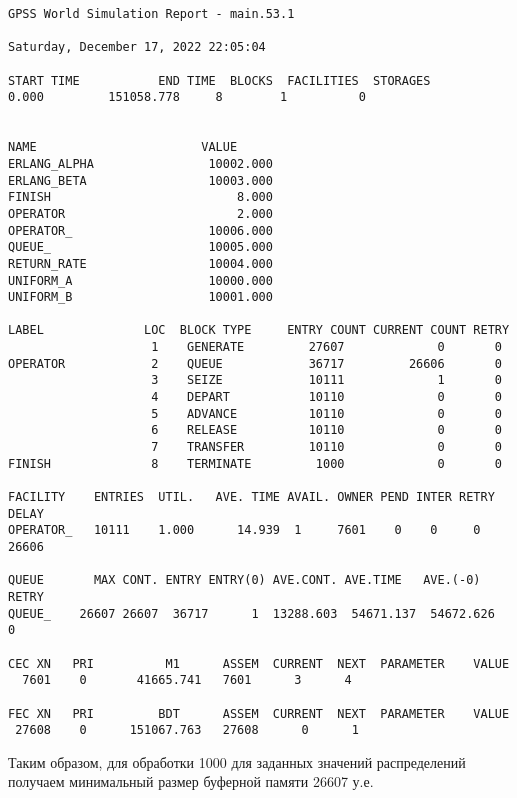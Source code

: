 \begin{lstlisting}
GPSS World Simulation Report - main.53.1

Saturday, December 17, 2022 22:05:04  

START TIME           END TIME  BLOCKS  FACILITIES  STORAGES
0.000         151058.778     8        1          0


NAME                       VALUE  
ERLANG_ALPHA                10002.000
ERLANG_BETA                 10003.000
FINISH                          8.000
OPERATOR                        2.000
OPERATOR_                   10006.000
QUEUE_                      10005.000
RETURN_RATE                 10004.000
UNIFORM_A                   10000.000
UNIFORM_B                   10001.000

LABEL              LOC  BLOCK TYPE     ENTRY COUNT CURRENT COUNT RETRY
					1    GENERATE         27607             0       0
OPERATOR            2    QUEUE            36717         26606       0
					3    SEIZE            10111             1       0
					4    DEPART           10110             0       0
					5    ADVANCE          10110             0       0
					6    RELEASE          10110             0       0
					7    TRANSFER         10110             0       0
FINISH              8    TERMINATE         1000             0       0

FACILITY	ENTRIES  UTIL.   AVE. TIME AVAIL. OWNER PEND INTER RETRY DELAY
OPERATOR_	10111    1.000      14.939  1     7601    0    0     0   26606

QUEUE		MAX CONT. ENTRY ENTRY(0) AVE.CONT. AVE.TIME   AVE.(-0) RETRY
QUEUE_    26607 26607  36717      1  13288.603  54671.137  54672.626   0

CEC XN   PRI          M1      ASSEM  CURRENT  NEXT  PARAMETER    VALUE
  7601    0       41665.741   7601      3      4

FEC XN   PRI         BDT      ASSEM  CURRENT  NEXT  PARAMETER    VALUE
 27608    0      151067.763   27608      0      1
\end{lstlisting}

Таким образом, для обработки 1000 для заданных значений распределений получаем минимальный размер буферной памяти 26607 у.е.






